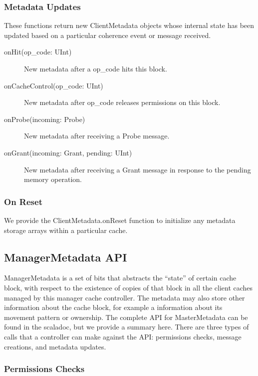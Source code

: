 \subsubsection{Metadata Updates}

These functions return new ClientMetadata objects whose internal state has been updated based on a particular coherence event or message received.

\begin{description}
\item[onHit(op\_code: UInt) ]
New metadata after a op\_code hits this block.
\item[onCacheControl(op\_code: UInt) ]
New metadata after op\_code releases permissions on this block.
\item[onProbe(incoming: Probe) ]
New metadata after receiving a Probe message.
\item[onGrant(incoming: Grant, pending: UInt) ]
New metadata after receiving a Grant message in response to the pending memory operation.
\end{description}

\subsubsection{On Reset}

We provide the ClientMetadata.onReset function to initialize any metadata storage arrays within a particular cache.

\subsection{ManagerMetadata API} 

ManagerMetadata is a set of bits that abstracts the “state” of certain cache block,
with respect to the existence of copies of that block in all the client caches
managed by this manager cache controller.
The metadata may also store other information about the cache block,
for example a information about its movement pattern or ownership.
The complete API for MasterMetadata can be found in the scaladoc,
but we provide a summary here.
There are three types of calls that a controller can make against the API:
permissions checks, message creations, and metadata updates.

\subsubsection{Permissions Checks}

